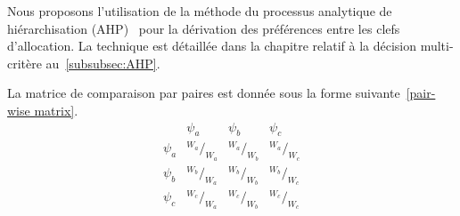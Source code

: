 %
%
%

Nous proposons l'utilisation de la méthode du processus analytique de hiérarchisation (AHP)~\cite{saaty_decision_2004} pour la dérivation des préférences entre les clefs d'allocation.
La technique est détaillée dans la chapitre relatif à la décision multi-critère au~\ref{subsubsec:AHP}.

La matrice de comparaison par paires est donnée sous la forme suivante~\eqref{pair-wise matrix}.
\begin{equation}
\begin{matrix}
	& \psi_{a} & \psi_{b} & \psi_{c} \\
\psi_{a} & ^{W_a}/_{W_a} & ^{W_a}/_{W_b} & ^{W_a}/_{W_c} \\
\psi_{b} & ^{W_b}/_{W_a} & ^{W_b}/_{W_b} & ^{W_b}/_{W_c} \\
\psi_{c} & ^{W_c}/_{W_a} & ^{W_c}/_{W_b} & ^{W_c}/_{W_c} \\
\end{matrix}
\label{pair-wise matrix}
\end{equation}


%

